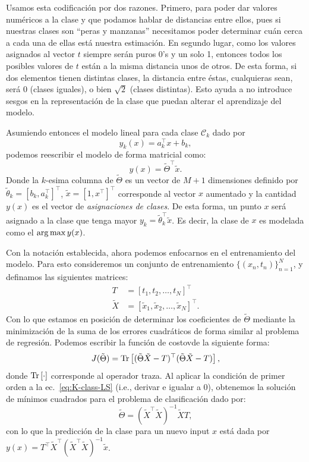 \begin{remark}
Usamos esta codificación por  dos razones. Primero, para poder dar valores numéricos a la clase y que  podamos hablar de distancias entre ellos, pues si nuestras clases son ``peras y manzanas'' necesitamos poder determinar cuán cerca a cada una de ellas está nuestra estimación. En segundo  lugar, como los valores asignados al vector $t$ siempre serán puros 0's y un solo 1, entonces  todos los posibles  valores de $t$ están a la misma distancia unos de otros. De esta forma, si dos elementos tienen distintas clases, la distancia entre éstas, cualquieras sean, será 0 (clases iguales), o bien $\sqrt{2}$ (clases distintas). Esto ayuda a no introduce sesgos en la representación de la clase que puedan alterar el aprendizaje del modelo.  	
\end{remark}

Asumiendo entonces el modelo lineal para cada clase $\mathcal{C}_k$ dado por
\begin{equation}
	y_k(x) = a_k^\top x + b_k,
\end{equation}
podemos reescribir el modelo de forma matricial como:	
\begin{equation}
	y(x) = \tilde{\Theta}^\top \tilde{x}.
\end{equation}
Donde la $k$-esima columna de $\tilde{\Theta}$ es un vector de $M+1$ dimensiones definido por $\tilde{\theta}_k=[b_k, a_k^\top]^\top$, $\tilde{x}=[1,x^\top]^\top$ corresponde al vector $x$ aumentado y la cantidad $y(x)$ es el vector de \emph{asignaciones de clases}. De esta forma, un punto $x$ será asignado a la clase que tenga mayor $y_k=\tilde{\theta}_k^\top \tilde{x}$. Es  decir, la clase de $x$ es modelada como  el  $\operatorname*{arg\,max} y(x)$.

Con la notación establecida, ahora podemos enfocarnos en el entrenamiento del modelo. Para esto consideremos un conjunto de entrenamiento $\{(x_n,t_n)\}_{n=1}^N$, y definamos las siguientes matrices:
\begin{align}
	T &= [t_1, t_2,\ldots, t_N]^\top\\
	\tilde{X} &= [\tilde{x}_1, \tilde{x}_2, \ldots, \tilde{x}_N ]^\top.
\end{align}
Con lo que estamos en posición de determinar los coeficientes de $\tilde{\Theta}$ mediante la minimización de la suma de los errores cuadráticos de forma similar al problema de regresión. Podemos escribir la función de costovde la siguiente forma:
\begin{equation}
	J(\tilde{\Theta}) = \text{Tr} \left[(\tilde{\Theta}\tilde{X}-T)^\top(\tilde{\Theta}\tilde{X}-T)\right],\label{eq:K-class-LS}
\end{equation}
donde $\text{Tr} \left[\cdot\right]$ corresponde al operador traza. Al aplicar la condición de primer orden a la ec.~\eqref{eq:K-class-LS} (i.e., derivar e igualar a 0), obtenemos la solución de mínimos cuadrados para el problema de clasificación dado por:
\begin{equation}
	\tilde{\Theta} = (\tilde{X}^\top\tilde{X})^{-1}\tilde{X}T,
\end{equation}
con lo que la predicción de la clase para un nuevo input $x$ está dada por $ y(x) = T^\top\tilde{X}^\top(\tilde{X}^\top\tilde{X})^{-1}\tilde{x}$.

